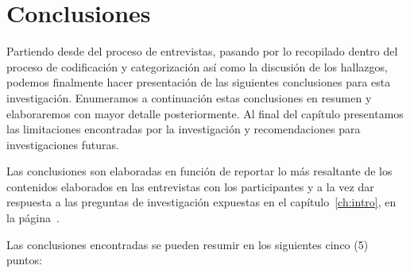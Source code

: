 \chapter{Conclusiones}\label{ch:conclusion}
%
%
%
%
%
%
%
%
%
%

Partiendo desde del proceso de entrevistas, pasando por lo recopilado dentro del
proceso de codificación y categorización así como la discusión de los hallazgos,
podemos finalmente hacer presentación de las siguientes conclusiones para esta
investigación. Enumeramos a continuación estas conclusiones en resumen y
elaboraremos con mayor detalle posteriormente. Al final del capítulo presentamos
las limitaciones encontradas por la investigación y recomendaciones para
investigaciones futuras.

Las conclusiones son elaboradas en función de reportar lo más resaltante de los
contenidos elaborados en las entrevistas con los participantes y a la vez dar
respuesta a las preguntas de investigación expuestas en el
capítulo~\ref{ch:intro}, en la página~\pageref{preguntas}.

Las conclusiones encontradas se pueden resumir en los siguientes cinco (5)
puntos:

